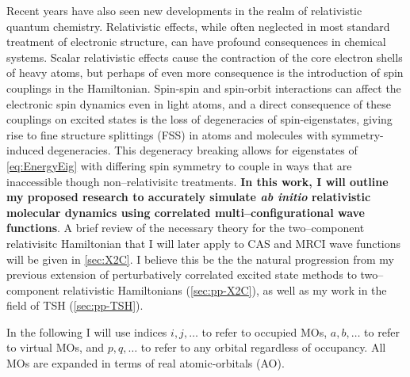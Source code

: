 \documentclass[12pt]{article}
\begin{document}
Recent years have also seen new developments in the realm of relativistic
quantum chemistry.  Relativistic effects, while often neglected in most
standard treatment of electronic structure, can have profound consequences in
chemical systems.\cite{Pyykko12_45} Scalar relativistic effects cause the
contraction of the core electron shells of heavy atoms, but perhaps of even
more consequence is the introduction of spin couplings in the Hamiltonian.
Spin-spin and spin-orbit interactions can affect the electronic spin dynamics
even in light atoms, and a direct consequence of these couplings on excited
states is the loss of degeneracies of spin-eigenstates, giving rise to fine
structure splittings (FSS) in atoms and molecules with symmetry-induced
degeneracies. This degeneracy breaking allows for eigenstates of
\cref{eq:EnergyEig} with differing spin symmetry to couple in ways that are
inaccessible though non--relativisitc treatments.
\textbf{In this work, I will outline my proposed research to accurately simulate
\emph{ab initio} relativistic molecular dynamics using correlated
multi--configurational wave functions}.  
A brief review of the necessary theory for the two--component relativisitc
Hamiltonian that I will later apply to CAS and MRCI wave functions will be given
in \cref{sec:X2C}. I believe this be the the natural progression from my previous
extension of perturbatively correlated excited state methods to two--component
relativistic Hamiltonians\cite{DBWY16_Accepted1} (\cref{sec:pp-X2C}), as well as
my work in the field of TSH\cite{DBWY16_Submitted1} (\cref{sec:pp-TSH}). 


In the following  I will use indices $i,j,\dots$ to refer to occupied MOs,
$a,b,\dots$ to refer to virtual MOs, and $p,q,\dots$ to refer to any orbital
regardless of occupancy.  All MOs are expanded in terms of real atomic-orbitals
(AO).
\end{document}
